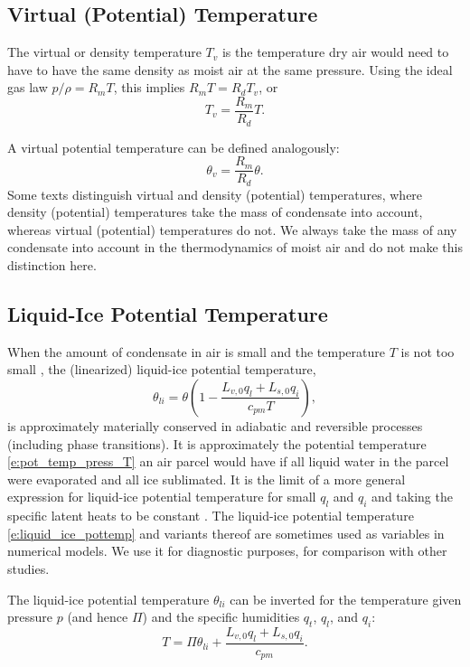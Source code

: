 \documentclass{report}
\begin{document}
\subsection{Virtual (Potential) Temperature} The virtual or density temperature $T_v$ is the temperature dry air would need to have to have the same density as moist air at the same pressure. Using the ideal gas law $p/\rho = R_m T$, this implies $R_m T  = R_d T_v $, or
\begin{equation}\label{e:virtual_temp}
T_v = \frac{R_m}{R_d} T.
\end{equation}

A virtual potential temperature can be defined analogously:
\begin{equation}\label{e:virtual_pottemp}
\theta_v = \frac{R_m}{R_d} \theta.
\end{equation}
Some texts distinguish virtual and density (potential) temperatures, where density (potential) temperatures take the mass of condensate into account, whereas virtual (potential) temperatures do not. We always take the mass of any condensate into account in the thermodynamics of moist air and do not make this distinction here. 

\subsection{Liquid-Ice Potential Temperature}

When the amount of condensate in air is small and the temperature $T$ is not too small \citep[e.g.,][]{Tripoli81}, the (linearized) liquid-ice potential temperature,
\begin{equation}\label{e:liquid_ice_pottemp}
\theta_{li} = \theta \left( 1 - \frac{L_{v,0} q_l + L_{s, 0} q_i}{c_{pm} T} \right),
\end{equation}
is approximately materially conserved in adiabatic and reversible processes (including phase transitions). It is approximately the potential temperature \eqref{e:pot_temp_press_T} an air parcel would have if all liquid water in the parcel were evaporated and all ice sublimated. It is the limit of a more general expression for liquid-ice potential temperature for small $q_l$ and $q_i$ and taking the specific latent heats to be constant \citep[e.g.,][]{Bryan04a}. The liquid-ice potential temperature \eqref{e:liquid_ice_pottemp} and variants thereof are sometimes used as variables in numerical models. We use it for diagnostic purposes, for comparison with other studies.

The liquid-ice potential temperature $\theta_{li}$ can be inverted for the temperature given pressure $p$ (and hence $\Pi$) and the specific humidities $q_t$, $q_l$, and $q_i$:
\begin{equation}\label{e:temp_from_theta_li_given_p}
    T = \Pi \theta_{li} + \frac{L_{v, 0} q_l + L_{s, 0} q_i}{c_{pm}}.
\end{equation}
\end{document}
